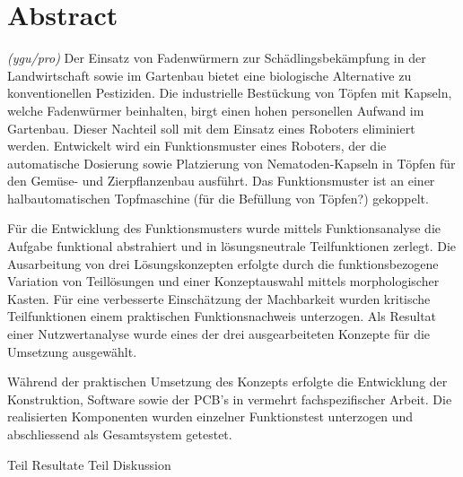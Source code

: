 \newpage
\section{Abstract}
\textit{(ygu/pro)} Der Einsatz von Fadenwürmern zur Schädlingsbekämpfung in der Landwirtschaft sowie im Gartenbau bietet eine biologische Alternative zu konventionellen Pestiziden. Die industrielle Bestückung von Töpfen mit Kapseln, welche Fadenwürmer beinhalten, birgt einen hohen personellen Aufwand im Gartenbau. Dieser Nachteil soll mit dem Einsatz eines Roboters eliminiert werden. Entwickelt wird ein Funktionsmuster eines Roboters, der die automatische Dosierung sowie Platzierung von Nematoden-Kapseln in Töpfen für den Gemüse- und Zierpflanzenbau ausführt. Das Funktionsmuster ist an einer halbautomatischen Topfmaschine (für die Befüllung von Töpfen?) gekoppelt.
\newline

Für die Entwicklung des Funktionsmusters wurde mittels Funktionsanalyse die Aufgabe funktional abstrahiert und in lösungsneutrale Teilfunktionen zerlegt. Die Ausarbeitung von drei Lösungskonzepten erfolgte durch die funktionsbezogene Variation von Teillösungen und einer Konzeptauswahl mittels morphologischer Kasten. Für eine verbesserte Einschätzung der Machbarkeit wurden kritische Teilfunktionen einem praktischen Funktionsnachweis unterzogen. Als Resultat einer Nutzwertanalyse wurde eines der drei ausgearbeiteten Konzepte für die Umsetzung ausgewählt. 
\newline

Während der praktischen Umsetzung des Konzepts erfolgte die Entwicklung der Konstruktion, Software sowie der PCB’s in vermehrt fachspezifischer Arbeit. Die realisierten Komponenten wurden einzelner Funktionstest unterzogen und abschliessend als Gesamtsystem getestet.
\newline

Teil Resultate
\newline
Teil Diskussion
